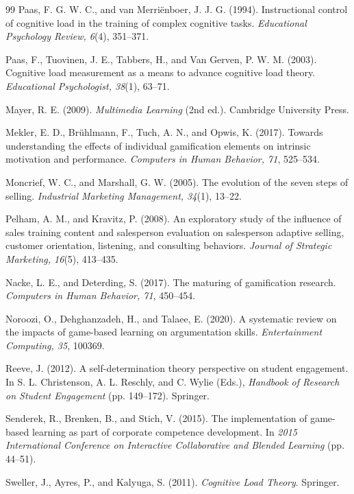 \documentclass[12pt]{report}
\begin{document}
\begin{thebibliography}{99}
Paas, F. G. W. C., and van Merri\"{e}nboer, J. J. G. (1994).
Instructional control of cognitive load in the training of complex cognitive tasks.
\textit{Educational Psychology Review, 6}(4), 351--371.

Paas, F., Tuovinen, J. E., Tabbers, H., and Van Gerven, P. W. M. (2003).
Cognitive load measurement as a means to advance cognitive load theory.
\textit{Educational Psychologist, 38}(1), 63--71.

Mayer, R. E. (2009).
\textit{Multimedia Learning} (2nd ed.).
Cambridge University Press.

Mekler, E. D., Br\"uhlmann, F., Tuch, A. N., and Opwis, K. (2017).
Towards understanding the effects of individual gamification elements on intrinsic motivation and performance.
\textit{Computers in Human Behavior, 71}, 525--534.

Moncrief, W. C., and Marshall, G. W. (2005).
The evolution of the seven steps of selling.
\textit{Industrial Marketing Management, 34}(1), 13--22.

Pelham, A. M., and Kravitz, P. (2008).
An exploratory study of the influence of sales training content and salesperson evaluation on salesperson adaptive selling, customer orientation, listening, and consulting behaviors.
\textit{Journal of Strategic Marketing, 16}(5), 413--435.

Nacke, L. E., and Deterding, S. (2017).
The maturing of gamification research.
\textit{Computers in Human Behavior, 71}, 450--454.

Noroozi, O., Dehghanzadeh, H., and Talaee, E. (2020).
A systematic review on the impacts of game-based learning on argumentation skills.
\textit{Entertainment Computing, 35}, 100369.

Reeve, J. (2012).
A self-determination theory perspective on student engagement.
In S. L. Christenson, A. L. Reschly, and C. Wylie (Eds.), \textit{Handbook of Research on Student Engagement} (pp. 149--172).
Springer.

Senderek, R., Brenken, B., and Stich, V. (2015).
The implementation of game-based learning as part of corporate competence development.
In \textit{2015 International Conference on Interactive Collaborative and Blended Learning} (pp. 44--51).

Sweller, J., Ayres, P., and Kalyuga, S. (2011).
\textit{Cognitive Load Theory}.
Springer.


\end{thebibliography}
\end{document}
